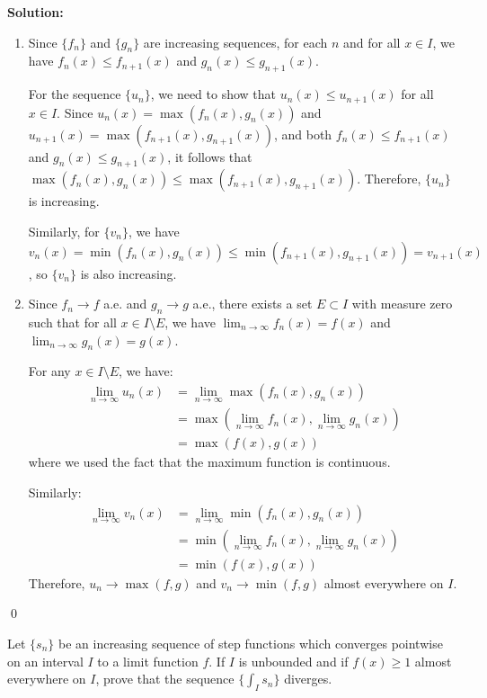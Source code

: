 \bigskip\noindent\textbf{Solution:}
\begin{enumerate}[label=(\alph*)]
\item Since $\{f_n\}$ and $\{g_n\}$ are increasing sequences, for each $n$ and for all $x \in I$, we have $f_n(x) \leq f_{n+1}(x)$ and $g_n(x) \leq g_{n+1}(x)$. 

For the sequence $\{u_n\}$, we need to show that $u_n(x) \leq u_{n+1}(x)$ for all $x \in I$. Since $u_n(x) = \max(f_n(x), g_n(x))$ and $u_{n+1}(x) = \max(f_{n+1}(x), g_{n+1}(x))$, and both $f_n(x) \leq f_{n+1}(x)$ and $g_n(x) \leq g_{n+1}(x)$, it follows that $\max(f_n(x), g_n(x)) \leq \max(f_{n+1}(x), g_{n+1}(x))$. Therefore, $\{u_n\}$ is increasing.

Similarly, for $\{v_n\}$, we have $v_n(x) = \min(f_n(x), g_n(x)) \leq \min(f_{n+1}(x), g_{n+1}(x)) = v_{n+1}(x)$, so $\{v_n\}$ is also increasing.

\item Since $f_n \to f$ a.e. and $g_n \to g$ a.e., there exists a set $E \subset I$ with measure zero such that for all $x \in I \setminus E$, we have $\lim_{n \to \infty} f_n(x) = f(x)$ and $\lim_{n \to \infty} g_n(x) = g(x)$.

For any $x \in I \setminus E$, we have:
\begin{align*}
\lim_{n \to \infty} u_n(x) &= \lim_{n \to \infty} \max(f_n(x), g_n(x)) \\
&= \max(\lim_{n \to \infty} f_n(x), \lim_{n \to \infty} g_n(x)) \\
&= \max(f(x), g(x))
\end{align*}
where we used the fact that the maximum function is continuous.

Similarly:
\begin{align*}
\lim_{n \to \infty} v_n(x) &= \lim_{n \to \infty} \min(f_n(x), g_n(x)) \\
&= \min(\lim_{n \to \infty} f_n(x), \lim_{n \to \infty} g_n(x)) \\
&= \min(f(x), g(x))
\end{align*}
Therefore, $u_n \to \max(f, g)$ and $v_n \to \min(f, g)$ almost everywhere on $I$.
\end{enumerate}\qed


\begin{problembox}
\begin{problemstatement}
Let $\{s_n\}$ be an increasing sequence of step functions which converges pointwise on an interval $I$ to a limit function $f$. If $I$ is unbounded and if $f(x) \geq 1$ almost everywhere on $I$, prove that the sequence $\{\int_I s_n\}$ diverges.
\end{problemstatement}
\end{problembox}

